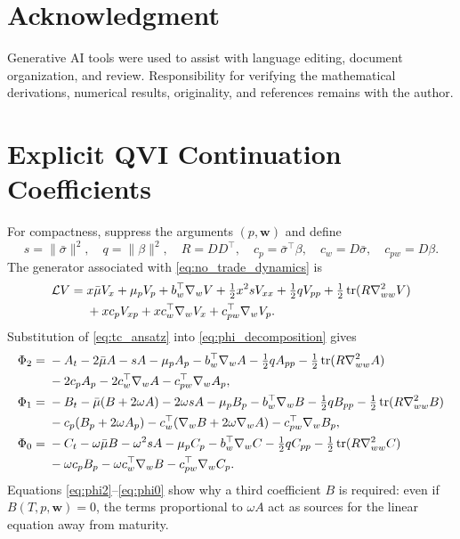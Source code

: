 \documentclass[a4paper,10pt]{article}
\newcommand{\bw}{\bm{w}}
\begin{document}
\section*{Acknowledgment}

Generative AI tools were used to assist with language editing, document organization, and review. Responsibility for verifying the mathematical derivations, numerical results, originality, and references remains with the author.

\appendix

\section{Explicit QVI Continuation Coefficients}
\label{app:qvi_coefficients}

For compactness, suppress the arguments $(p,\bw)$ and define
\begin{equation}
s=\|\bar\sigma\|^2,\quad
q=\|\beta\|^2,\quad
R=DD^\top,\quad
c_p=\bar\sigma^\top\beta,\quad
c_w=D\bar\sigma,\quad
c_{pw}=D\beta.
\end{equation}
The generator associated with \eqref{eq:no_trade_dynamics} is
\begin{align}
\mathcal LV={}&x\bar\mu V_x+\mu_pV_p+b_w^\top\nabla_wV
+\tfrac12x^2sV_{xx}+\tfrac12qV_{pp}
+\tfrac12\operatorname{tr}(R\nabla^2_{ww}V) \notag\\
&+xc_pV_{xp}+xc_w^\top\nabla_wV_x
+c_{pw}^\top\nabla_wV_p.
\end{align}
Substitution of \eqref{eq:tc_ansatz} into \eqref{eq:phi_decomposition} gives
\begin{align}
\Phi_2={}&-A_t-2\bar\mu A-sA-\mu_pA_p-b_w^\top\nabla_wA
-\tfrac12qA_{pp}-\tfrac12\operatorname{tr}(R\nabla^2_{ww}A) \notag\\
&-2c_pA_p-2c_w^\top\nabla_wA-c_{pw}^\top\nabla_wA_p,
\label{eq:phi2}\\
\Phi_1={}&-B_t-\bar\mu(B+2\omega A)-2\omega sA
-\mu_pB_p-b_w^\top\nabla_wB
-\tfrac12qB_{pp}-\tfrac12\operatorname{tr}(R\nabla^2_{ww}B) \notag\\
&-c_p(B_p+2\omega A_p)
-c_w^\top(\nabla_wB+2\omega\nabla_wA)
-c_{pw}^\top\nabla_wB_p,
\label{eq:phi1}\\
\Phi_0={}&-C_t-\omega\bar\mu B-\omega^2sA
-\mu_pC_p-b_w^\top\nabla_wC
-\tfrac12qC_{pp}-\tfrac12\operatorname{tr}(R\nabla^2_{ww}C) \notag\\
&-\omega c_pB_p-\omega c_w^\top\nabla_wB
-c_{pw}^\top\nabla_wC_p.
\label{eq:phi0}
\end{align}
Equations \eqref{eq:phi2}--\eqref{eq:phi0} show why a third coefficient $B$ is required: even if $B(T,p,\bw)=0$, the terms proportional to $\omega A$ act as sources for the linear equation away from maturity.
\end{document}
